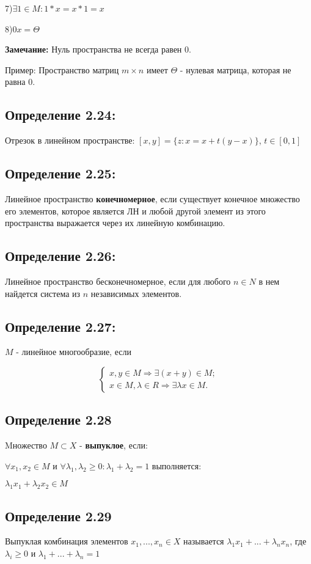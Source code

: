 \documentclass[12pt, english]{article}
\begin{document}
	7)$\exists 1 \in M: 1*x = x * 1 = x$
	
	8)$0x = \Theta$

\textbf{Замечание:}
	Нуль пространства не всегда равен 0.
	
	Пример: Пространство матриц $m \times n$ имеет $\Theta$ - нулевая матрица, которая не равна 0.
	
\subsection*{Определение 2.24:}
	Отрезок в линейном пространстве: $[x,y] = \{ z : x = x + t(y-x) \}$, $t \in [0,1]$
\subsection*{Определение 2.25:}
	Линейное пространство \textbf{конечномерное}, если существует конечное множество его элементов, которое является ЛН и любой другой
	элемент из этого пространства выражается через их линейную комбинацию.
	

	
\subsection*{Определение 2.26:}
	Линейное пространство бесконечномерное, если для любого $n \in N$  в нем найдется система из $n$ независимых элементов.
	
\subsection*{Определение 2.27:}
 	$M$ - линейное многообразие, если 	
	
$$
\begin{cases}
   x,y \in M \Rightarrow \exists (x+y) \in M; \\
   x \in M , \lambda \in R \Rightarrow \exists \lambda x \in M.
\end{cases}
$$

\subsection*{Определение 2.28}
	Mножество $M \subset X$ - \textbf{выпуклое}, если:
	
	$\forall x_1, x_2 \in M$ и $\forall \lambda_1 , \lambda_2 \ge 0 : \lambda_1 + \lambda_2 = 1$ выполняется:
	
	$\lambda_1 x_1 + \lambda_2 x_2 \in M$
	
\subsection*{Определение 2.29}
	Выпуклая комбинация элементов $x_1, ..., x_n \in X$ называется $\lambda_1 x_1 + ... + \lambda_n x_n$, где 
	$\lambda_i \ge 0$ и $\lambda_1  + ...+  \lambda_n = 1$
\end{document}
